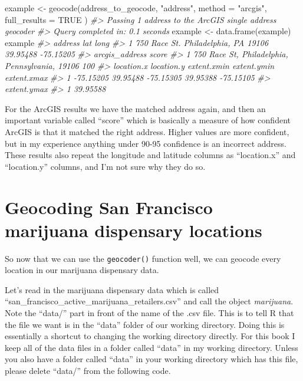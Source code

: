 \documentclass[
]{krantz}
\makeatletter
\newenvironment{Shaded}{\begin{snugshade}}{\end{snugshade}}
\newcommand{\AttributeTok}[1]{\textcolor[rgb]{0.61,0.61,0.61}{#1}}
\newcommand{\CommentTok}[1]{\textcolor[rgb]{0.37,0.37,0.37}{\textit{#1}}}
\newcommand{\ConstantTok}[1]{\textcolor[rgb]{0,0,0}{#1}}
\newcommand{\FunctionTok}[1]{\textcolor[rgb]{0,0,0}{#1}}
\newcommand{\NormalTok}[1]{#1}
\newcommand{\OtherTok}[1]{\textcolor[rgb]{0.37,0.37,0.37}{#1}}
\newcommand{\StringTok}[1]{\textcolor[rgb]{0.5,0.5,0.5}{#1}}
\newenvironment{kframe}{%
\medskip{}
\setlength{\fboxsep}{.8em}
 \def\at@end@of@kframe{}%
 \ifinner\ifhmode%
  \def\at@end@of@kframe{\end{minipage}}%
  \begin{minipage}{\columnwidth}%
 \fi\fi%
 \def\FrameCommand##1{\hskip\@totalleftmargin \hskip-\fboxsep
 \colorbox{shadecolor}{##1}\hskip-\fboxsep
     \hskip-\linewidth \hskip-\@totalleftmargin \hskip\columnwidth}%
 \MakeFramed {\advance\hsize-\width
   \@totalleftmargin\z@ \linewidth\hsize
   \@setminipage}}%
 {\par\unskip\endMakeFramed%
 \at@end@of@kframe}
\renewenvironment{Shaded}{\begin{kframe}}{\end{kframe}}
\makeatother
\begin{document}
\begin{Shaded}
\begin{Highlighting}[]
\NormalTok{example }\OtherTok{\textless{}{-}} \FunctionTok{geocode}\NormalTok{(address\_to\_geocode, }\StringTok{"address"}\NormalTok{,}
  \AttributeTok{method =} \StringTok{"arcgis"}\NormalTok{, }\AttributeTok{full\_results =} \ConstantTok{TRUE}
\NormalTok{)}
\CommentTok{\#\textgreater{} Passing 1 address to the ArcGIS single address geocoder}
\CommentTok{\#\textgreater{} Query completed in: 0.1 seconds}
\NormalTok{example }\OtherTok{\textless{}{-}} \FunctionTok{data.frame}\NormalTok{(example)}
\NormalTok{example}
\CommentTok{\#\textgreater{}                               address      lat      long}
\CommentTok{\#\textgreater{} 1 750 Race St. Philadelphia, PA 19106 39.95488 {-}75.15205}
\CommentTok{\#\textgreater{}                                   arcgis\_address score}
\CommentTok{\#\textgreater{} 1 750 Race St, Philadelphia, Pennsylvania, 19106   100}
\CommentTok{\#\textgreater{}   location.x location.y extent.xmin extent.ymin extent.xmax}
\CommentTok{\#\textgreater{} 1  {-}75.15205   39.95488   {-}75.15305    39.95388   {-}75.15105}
\CommentTok{\#\textgreater{}   extent.ymax}
\CommentTok{\#\textgreater{} 1    39.95588}
\end{Highlighting}
\end{Shaded}

For the ArcGIS results we have the matched address again,
and then an important variable called ``score'' which is
basically a measure of how confident ArcGIS is that it
matched the right address. Higher values are more confident,
but in my experience anything under 90-95 confidence is an
incorrect address. These results also repeat the longitude
and latitude columns as ``location.x'' and ``location.y''
columns, and I'm not sure why they do so.

\hypertarget{geocoding-san-francisco-marijuana-dispensary-locations}{%
\section{Geocoding San Francisco marijuana dispensary
locations}\label{geocoding-san-francisco-marijuana-dispensary-locations}}

So now that we can use the \texttt{geocoder()} function
well, we can geocode every location in our marijuana
dispensary data.

Let's read in the marijuana dispensary data which is called
``san\_francisco\_active\_marijuana\_retailers.csv'' and
call the object \emph{marijuana}. Note the ``data/'' part in
front of the name of the .csv file. This is to tell R that
the file we want is in the ``data'' folder of our working
directory. Doing this is essentially a shortcut to changing
the working directory directly. For this book I keep all of
the data files in a folder called ``data'' in my working
directory. Unless you also have a folder called ``data'' in
your working directory which has this file, please delete
``data/'' from the following code.
\end{document}
